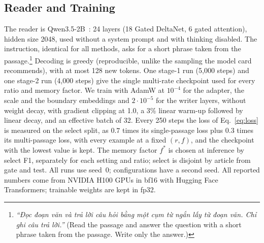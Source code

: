 \subsection{Reader and Training}
\label{sec:impl}
The reader is Qwen3.5-2B~\cite{qwen35}: 24 layers (18 Gated DeltaNet, 6 gated attention), hidden size 2048, used without a system prompt and with thinking disabled.
The instruction, identical for all methods, asks for a short phrase taken from the passage.\footnote{\textit{``Đọc đoạn văn và trả lời câu hỏi bằng một cụm từ ngắn lấy từ đoạn văn. Chỉ ghi câu trả lời.''} (Read the passage and answer the question with a short phrase taken from the passage. Write only the answer.)}
Decoding is greedy (reproducible, unlike the sampling the model card recommends), with at most 128 new tokens.
One stage-1 run (5,000 steps) and one stage-2 run (4,000 steps) give the single multi-rate checkpoint used for every ratio and memory factor.
We train with AdamW at $10^{-4}$ for the adapter, the scale and the boundary embeddings and $2\cdot10^{-5}$ for the writer layers, without weight decay, with gradient clipping at 1.0, a 3\% linear warm-up followed by linear decay, and an effective batch of 32.
Every 250 steps the loss of Eq.~\eqref{eq:loss} is measured on the select split, as $0.7$ times its single-passage loss plus $0.3$ times its multi-passage loss, with every example at a fixed $(r, f)$, and the checkpoint with the lowest value is kept.
The memory factor $f^\ast$ is chosen at inference by select F1, separately for each setting and ratio; select is disjoint by article from gate and test.
All runs use seed~0; \tbd{} configurations have a second seed.
All reported numbers come from NVIDIA H100 GPUs in bf16 with Hugging Face Transformers; trainable weights are kept in fp32.

